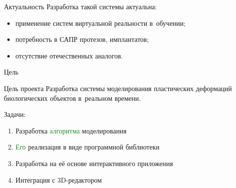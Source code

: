 \documentclass[usenames,dvipsnames,pdftex,unicode,hidelinks]{beamer}
\begin{document}
  \begin{frame}{Актуальность}
    Разработка такой системы актуальна:
    \begin{itemize}
      \item применение систем виртуальной реальности \alert{в~обучении};
      \item потребность в \alert{САПР} протезов, имплантатов;
      \item отсутствие \alert{отечественных} аналогов.
    \end{itemize}

    \vspace{0.5cm}

  \end{frame}

  \begin{frame}{Цель}
    \begin{block}{Цель проекта}
      Разработка \alert{системы моделирования} пластических деформаций биологических объектов
      \alert{в~реальном времени}.
    \end{block}

    \vspace{0.5cm}

    Задачи:
    \begin{enumerate}
      \item Разработка \textcolor{ForestGreen}{алгоритма} моделирования
      \item \textcolor{ForestGreen}{Его} реализация в виде \textcolor{RoyalPurple}{программной библиотеки}
      \item Разработка на \textcolor{RoyalPurple}{её} основе \textcolor{NavyBlue}{интерактивного приложения}
      \item<new@1-> Интеграция с 3D-редактором
    \end{enumerate}
  \end{frame}
\end{document}
